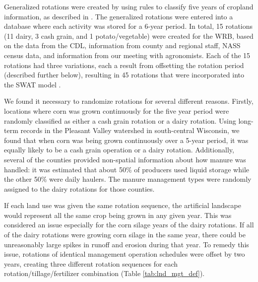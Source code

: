 Generalized rotations were created by using rules to classify five years of cropland information, as described in .  
The generalized rotations were entered into a database where each activity was stored for a 6-year
period. In total, 15 rotations (11 dairy, 3 cash grain, and 1 potato/vegetable) were created for the WRB,
based on the data from the CDL, information from county and regional staff, NASS census data, and
information from our meeting with agronomists. Each of the 15 rotations had three
variations, each a result from offsetting the rotation period (described further below), resulting in 45 rotations that were incorporated into the SWAT model .


We found it necessary to randomize rotations for several different reasons. Firstly, locations where corn was grown continuously for the five year period were randomly classified as either a cash grain rotation or a dairy rotation. Using long-term records in the Pleasant Valley watershed in south-central Wisconsin, we found that when corn was being grown continuously over a 5-year period, it was equally likely to be a cash grain operation or a dairy rotation. Additionally, several of the counties provided non-spatial information about how manure was handled: it was estimated that about 50\% of producers used liquid storage while the other 50\% were daily haulers. The manure management types were randomly assigned to the dairy rotations for those counties.  

If each land use was given the same rotation sequence, the artificial landscape would represent all the same crop being grown in any given year. This was considered an issue especially for the corn silage years of the dairy rotations. If all of the dairy rotations were growing corn silage in the same year, there could be unreasonably large spikes in runoff and erosion during that year. To remedy this issue, rotations of identical management operation schedules were offset by two years, creating three different rotation sequences for each rotation/tillage/fertilizer combination (Table \ref{tab:lnd_mgt_def}).
